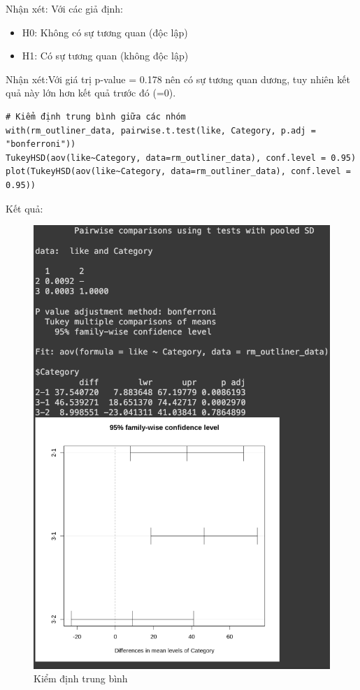 \begin{itemize}
        Nhận xét:
    Với các giả định:
        \begin{itemize}
            \item H0: Không có sự tương quan (độc lập)
            \item H1: Có sự tương quan (không độc lập)
        \end{itemize}
    Nhận xét:Với giá trị p-value = 0.178 nên có sự tương quan dương, tuy nhiên kết quả này lớn hơn kết quả trước đó (=0).
    \begin{lstlisting}
# Kiểm định trung bình giữa các nhóm 
with(rm_outliner_data, pairwise.t.test(like, Category, p.adj = "bonferroni"))
TukeyHSD(aov(like~Category, data=rm_outliner_data), conf.level = 0.95)
plot(TukeyHSD(aov(like~Category, data=rm_outliner_data), conf.level = 0.95))
    \end{lstlisting}
    Kết quả:
    \begin{figure}[H]
        \centering
        \includegraphics[width=0.8\linewidth]{part23_figures/29.png}
        \caption{Kiểm định trung bình}
        \label{fig:Kiểm định trung bình}
    \end{figure}


\end{itemize}
